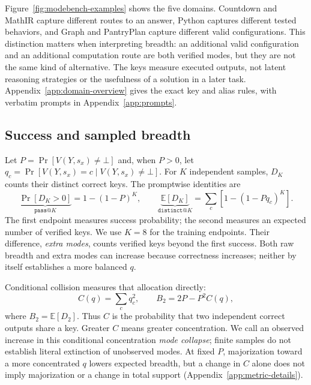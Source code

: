 \documentclass{article}
\newcommand{\1}{\mathbf 1}
\newcommand{\E}{\mathbb E}
\theoremstyle{remark}
\theoremstyle{definition}
\theoremstyle{plain}
\begin{document}
Figure~\ref{fig:modebench-examples} shows the five domains. Countdown and MathIR
capture different routes to an answer, Python captures different tested
behaviors, and Graph and PantryPlan capture different valid configurations.
This distinction matters when interpreting breadth: an additional valid
configuration and an additional computation route are both verified modes,
but they are not the same kind of alternative. The keys measure executed
outputs, not latent reasoning strategies or the usefulness of a solution in
a later task. Appendix~\ref{app:domain-overview} gives the exact key and alias
rules, with verbatim prompts in Appendix~\ref{app:prompts}.

\subsection{Success and sampled breadth}
\label{sec:collapse-metrics}

Let $P=\Pr[V(Y,s_x)\ne\bot]$ and, when $P>0$, let
$q_c=\Pr[V(Y,s_x)=c\mid V(Y,s_x)\ne\bot]$. For $K$ independent samples,
$D_K$ counts their distinct correct keys. The promptwise identities are
\begin{equation}
 \underbrace{\Pr[D_K>0]}_{\texttt{pass@}K}=1-(1-P)^K,
 \qquad
 \underbrace{\E[D_K]}_{\texttt{distinct@}K}
 =\sum_c[1-(1-Pq_c)^K].
 \label{eq:main-occupancy}
\end{equation}
The first endpoint measures success probability; the second measures an
expected number of verified keys. We use $K=8$ for the training endpoints.
Their difference, \emph{extra modes}, counts verified keys beyond the first
success. Both raw breadth and extra modes can increase because correctness
increases; neither by itself establishes a more balanced $q$.

Conditional collision measures that allocation directly:
\begin{equation}
 C(q)=\sum_c q_c^2,
 \qquad B_2=2P-P^2C(q),
 \label{eq:main-collision}
\end{equation}
where $B_2=\E[D_2]$. Thus $C$ is the probability that two independent correct
outputs share a key. Greater $C$ means greater concentration. We call an
observed increase in this conditional concentration \emph{mode collapse};
finite samples do not establish literal extinction of unobserved modes.
At fixed $P$, majorization toward a more concentrated $q$ lowers expected
breadth, but a change in $C$ alone does not imply majorization or a change
in total support (Appendix~\ref{app:metric-details}).
\end{document}

